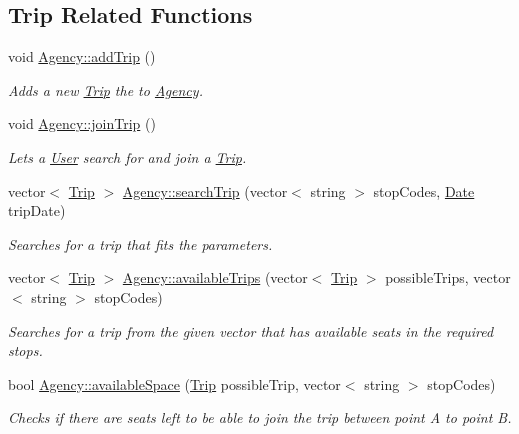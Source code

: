 \subsection*{Trip Related Functions}
\begin{DoxyCompactItemize}
\item 
void \hyperlink{group___agency_gaa0c7d82673ce6b573ccc46da3289634c}{Agency\+::add\+Trip} ()
\begin{DoxyCompactList}\small\item\em Adds a new \hyperlink{class_trip}{Trip} the to \hyperlink{class_agency}{Agency}. \end{DoxyCompactList}\item 
\mbox{\label{group___agency_gae2599882efc55adb7f295aeec65520d6}} 
void \hyperlink{group___agency_gae2599882efc55adb7f295aeec65520d6}{Agency\+::join\+Trip} ()
\begin{DoxyCompactList}\small\item\em Lets a \hyperlink{class_user}{User} search for and join a \hyperlink{class_trip}{Trip}. \end{DoxyCompactList}\item 
vector$<$ \hyperlink{class_trip}{Trip} $>$ \hyperlink{group___agency_ga7ec6b058801f49850148979c1a41554a}{Agency\+::search\+Trip} (vector$<$ string $>$ stop\+Codes, \hyperlink{class_date}{Date} trip\+Date)
\begin{DoxyCompactList}\small\item\em Searches for a trip that fits the parameters. \end{DoxyCompactList}\item 
vector$<$ \hyperlink{class_trip}{Trip} $>$ \hyperlink{group___agency_ga892474fd8930e8e78e743e2b185b35ac}{Agency\+::available\+Trips} (vector$<$ \hyperlink{class_trip}{Trip} $>$ possible\+Trips, vector$<$ string $>$ stop\+Codes)
\begin{DoxyCompactList}\small\item\em Searches for a trip from the given vector that has available seats in the required stops. \end{DoxyCompactList}\item 
bool \hyperlink{group___agency_ga9defb73f53ce32bc6382843dd46fc464}{Agency\+::available\+Space} (\hyperlink{class_trip}{Trip} possible\+Trip, vector$<$ string $>$ stop\+Codes)
\begin{DoxyCompactList}\small\item\em Checks if there are seats left to be able to join the trip between point A to point B. \end{DoxyCompactList}\item 

\end{DoxyCompactItemize}
